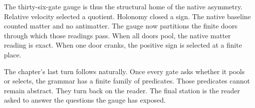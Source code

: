 The thirty-six-gate gauge is thus the structural home of the native
asymmetry. Relative velocity selected a quotient. Holonomy closed a sign.
The native baseline counted matter and no antimatter. The gauge now
partitions the finite doors through which those readings pass. When all
doors pool, the native matter reading is exact. When one door cranks, the
positive sign is selected at a finite place.

The chapter's last turn follows naturally. Once every gate asks whether it
pools or selects, the grammar has a finite family of predicates. Those
predicates cannot remain abstract. They turn back on the reader. The final
station is the reader asked to answer the questions the gauge has exposed.
